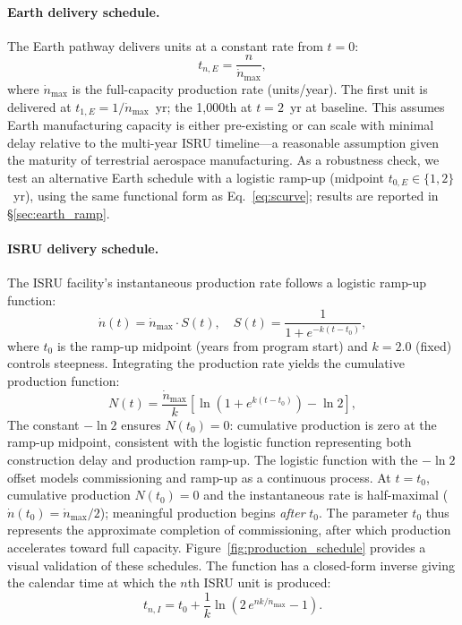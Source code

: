 \documentclass[preprint,12pt]{elsarticle}
\begin{document}
\paragraph{Earth delivery schedule.} The Earth pathway delivers units at a constant rate from $t = 0$:
\begin{equation}
  t_{n,E} = \frac{n}{\dot{n}_{\max}},
  \label{eq:earth_schedule}
\end{equation}
where $\dot{n}_{\max}$ is the full-capacity production rate (units/year). The first unit is delivered at $t_{1,E} = 1/\dot{n}_{\max}$~yr; the 1{,}000th at $t = 2$~yr at baseline. This assumes Earth manufacturing capacity is either pre-existing or can scale with minimal delay relative to the multi-year ISRU timeline---a reasonable assumption given the maturity of terrestrial aerospace manufacturing. As a robustness check, we test an alternative Earth schedule with a logistic ramp-up (midpoint $t_{0,E} \in \{1, 2\}$~yr), using the same functional form as Eq.~\ref{eq:scurve}; results are reported in \S\ref{sec:earth_ramp}.

\paragraph{ISRU delivery schedule.} The ISRU facility's instantaneous production rate follows a logistic ramp-up function:
\begin{equation}
  \dot{n}(t) = \dot{n}_{\max} \cdot S(t), \quad S(t) = \frac{1}{1 + e^{-k(t - t_0)}},
  \label{eq:scurve}
\end{equation}
where $t_0$ is the ramp-up midpoint (years from program start) and $k = 2.0$ (fixed) controls steepness. Integrating the production rate yields the cumulative production function:
\begin{equation}
  N(t) = \frac{\dot{n}_{\max}}{k} \left[ \ln\!\left(1 + e^{k(t - t_0)}\right) - \ln 2 \right],
  \label{eq:cumulative_production}
\end{equation}
The constant $-\ln 2$ ensures $N(t_0) = 0$: cumulative production is zero at the ramp-up midpoint, consistent with the logistic function representing both construction delay and production ramp-up. The logistic function with the $-\ln 2$ offset models commissioning and ramp-up as a continuous process. At $t = t_0$, cumulative production $N(t_0) = 0$ and the instantaneous rate is half-maximal ($\dot{n}(t_0) = \dot{n}_{\max}/2$); meaningful production begins \emph{after} $t_0$. The parameter $t_0$ thus represents the approximate completion of commissioning, after which production accelerates toward full capacity. Figure~\ref{fig:production_schedule} provides a visual validation of these schedules. The function has a closed-form inverse giving the calendar time at which the $n$th ISRU unit is produced:
\begin{equation}
  t_{n,I} = t_0 + \frac{1}{k} \ln\!\left(2\,e^{nk/\dot{n}_{\max}} - 1\right).
  \label{eq:production_schedule}
\end{equation}
\end{document}
